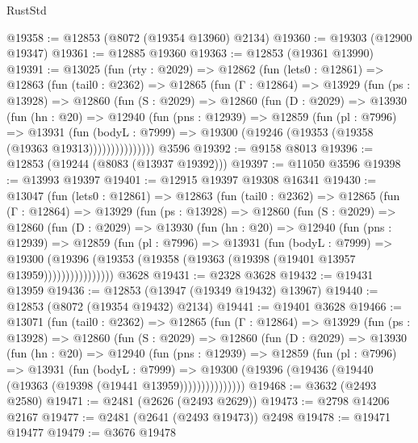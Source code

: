 \begin{lexlean}{RustStd}
\begin{coremodule}
@19358 := @12853 (@8072 (@19354 @13960) @2134)
@19360 := @19303 (@12900 @19347)
@19361 := @12885 @19360
@19363 := @12853 (@19361 @13990)
@19391 := @13025
    (fun (rty : @2029) =>
    @12862
      (fun (lets0 : @12861) =>
      @12863
        (fun (tail0 : @2362) =>
        @12865
          (fun (Γ : @12864) =>
          @13929
            (fun (ps : @13928) =>
            @12860
              (fun (S : @2029) =>
              @12860
                (fun (D : @2029) =>
                @13930
                  (fun (hn : @20) =>
                  @12940
                    (fun (pns : @12939) =>
                    @12859
                      (fun (pl : @7996) =>
                      @13931
                        (fun (bodyL : @7999) =>
                        @19300 (@19246 (@19353 (@19358 (@19363 @19313)))))))))))))))
    @3596
@19392 := @9158 @8013
@19396 := @12853 (@19244 (@8083 (@13937 @19392)))
@19397 := @11050 @3596
@19398 := @13993 @19397
@19401 := @12915 @19397 @19308 @16341
@19430 := @13047
    (fun (lets0 : @12861) =>
    @12863
      (fun (tail0 : @2362) =>
      @12865
        (fun (Γ : @12864) =>
        @13929
          (fun (ps : @13928) =>
          @12860
            (fun (S : @2029) =>
            @12860
              (fun (D : @2029) =>
              @13930
                (fun (hn : @20) =>
                @12940
                  (fun (pns : @12939) =>
                  @12859
                    (fun (pl : @7996) =>
                    @13931
                      (fun (bodyL : @7999) =>
                      @19300
                        (@19396
                          (@19353 (@19358 (@19363 (@19398 (@19401 @13957 @13959))))))))))))))))
    @3628
@19431 := @2328 @3628
@19432 := @19431 @13959
@19436 := @12853 (@13947 (@19349 @19432) @13967)
@19440 := @12853 (@8072 (@19354 @19432) @2134)
@19441 := @19401 @3628
@19466 := @13071
    (fun (tail0 : @2362) =>
    @12865
      (fun (Γ : @12864) =>
      @13929
        (fun (ps : @13928) =>
        @12860
          (fun (S : @2029) =>
          @12860
            (fun (D : @2029) =>
            @13930
              (fun (hn : @20) =>
              @12940
                (fun (pns : @12939) =>
                @12859
                  (fun (pl : @7996) =>
                  @13931
                    (fun (bodyL : @7999) =>
                    @19300 (@19396 (@19436 (@19440 (@19363 (@19398 (@19441 @13959)))))))))))))))
@19468 := @3632 (@2493 @2580)
@19471 := @2481 (@2626 (@2493 @2629))
@19473 := @2798 @14206 @2167
@19477 := @2481 (@2641 (@2493 @19473)) @2498
@19478 := @19471 @19477
@19479 := @3676 @19478

\end{coremodule}
\end{lexlean}

